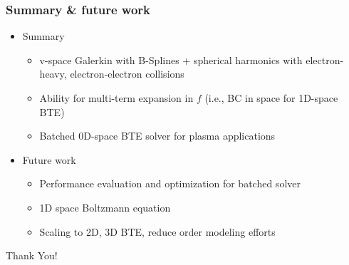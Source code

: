 \documentclass[mathserif, aspectratio=169]{beamer}
\begin{document}
\begin{frame}
	\frametitle{Summary \& future work}
	\begin{itemize}
		\item Summary
		\begin{itemize}
			\item v-space Galerkin with B-Splines + spherical harmonics with electron-heavy, electron-electron collisions
			\item Ability for multi-term expansion in $f$ (i.e., BC in space for 1D-space BTE)
			\item Batched 0D-space BTE solver for plasma applications
		\end{itemize}
		\item Future work
		\begin{itemize}
			\item Performance evaluation and optimization for batched solver
			\item 1D space Boltzmann equation
			\item Scaling to 2D, 3D BTE, reduce order modeling efforts
		\end{itemize}
	\end{itemize}
	\pause
	\begin{center}
		\Huge Thank You!
	\end{center}
\end{frame}
\end{document}

